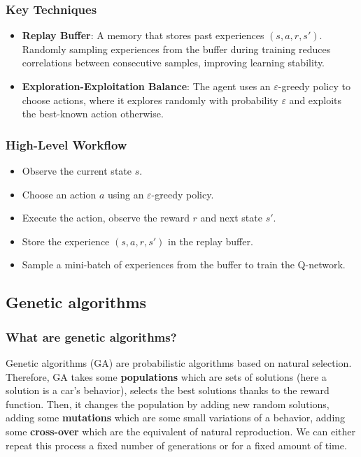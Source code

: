 \documentclass[11pt,a4paper]{article}
\newcommand{\mlist}[1]{\begin{itemize}[noitemsep,topsep=0pt]#1\end{itemize}}
\begin{document}
            \subsubsection*{Key Techniques}
\mlist{
    \item \textbf{Replay Buffer}: A memory that stores past experiences $(s, a, r, s')$. Randomly sampling experiences from the buffer during training reduces correlations between consecutive samples, improving learning stability.
    \item \textbf{Exploration-Exploitation Balance}: The agent uses an $\varepsilon$-greedy policy to choose actions, where it explores randomly with probability $\varepsilon$ and exploits the best-known action otherwise.
}
    
            \subsubsection*{High-Level Workflow}
\mlist{
\item Observe the current state $s$.
\item Choose an action $a$ using an $\varepsilon$-greedy policy.
\item Execute the action, observe the reward $r$ and next state $s'$.
\item Store the experience $(s, a, r, s')$ in the replay buffer.
\item Sample a mini-batch of experiences from the buffer to train the Q-network.
}
    


	
		\subsection*{Genetic algorithms}
			\subsubsection*{What are genetic algorithms?}
Genetic algorithms (GA) are probabilistic algorithms based on natural selection. Therefore, GA takes some \textbf{populations} which are sets of solutions (here a solution is a car's behavior), selects the best solutions thanks to the reward function. Then, it changes the population by adding new random solutions, adding some \textbf{mutations} which are some small variations of a behavior, adding some \textbf{cross-over} which are the equivalent of natural reproduction. We can either repeat this process a fixed number of generations or for a fixed amount of time.
		
\end{document}
